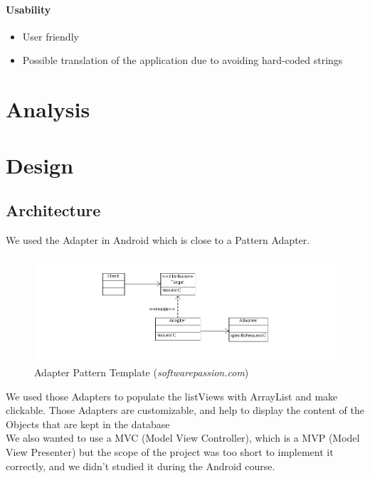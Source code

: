 \documentclass[paper=a4, fontsize=12pt,DIV=14]{scrartcl}    %
\begin{document}
        			\paragraph{Usability}
        			\begin{itemize}
        				\item User friendly
        				\item Possible translation of the application due to avoiding hard-coded strings
        			\end{itemize}


    \newpage
        \section{Analysis}


    \newpage
        \section{Design}
        	\subsection{Architecture}
We used the Adapter in Android which is close to a Pattern Adapter.

\begin{figure}[!htbp]
							\center
		                    \includegraphics[scale=0.5]{img/adapterpattern.png}
		                    \caption{Adapter Pattern Template (\textit{softwarepassion.com})}
\end{figure}

We used those Adapters to populate the listViews with ArrayList and make clickable. Those Adapters are customizable, and help to display the content of the Objects that are kept in the database \\

We also wanted to use a MVC (Model View Controller), which is a MVP (Model View Presenter) but the scope of the project was too short to implement it correctly, and we didn't studied it during the Android course.
\end{document}
